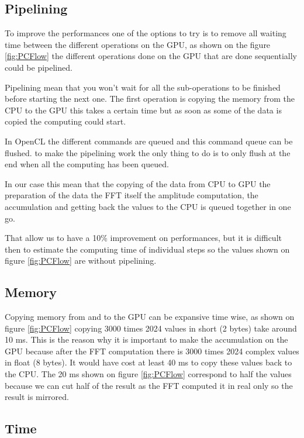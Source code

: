    \subsection{Pipelining}

   To improve the performances one of the options to try is to remove all waiting time between the different operations on the \gls{GPU}, as shown on the figure \ref{fig:PCFlow} the different operations done on the \gls{GPU} that are done sequentially could be pipelined.

   Pipelining mean that you won't wait for all the sub-operations to be finished before starting the next one. The first operation is copying the memory from the \gls{CPU} to the \gls{GPU} this takes a certain time but as soon as some of the data is copied the computing could start.

   In \gls{OpenCL} the different commands are queued and this command queue can be flushed. to make the pipelining work the only thing to do is to only flush at the end when all the computing has been queued.

   In our case this mean that the copying of the data from \gls{CPU} to \gls{GPU} the preparation of the data the \gls{FFT} itself the amplitude computation, the accumulation and getting back the values to the \gls{CPU} is queued together in one go.

   That allow us to have a 10\% improvement on performances, but it is difficult then to estimate the computing time of individual steps so the values shown on figure \ref{fig:PCFlow} are without pipelining.

   \subsection{Memory}

   Copying memory from and to the \gls{GPU} can be expansive time wise, as shown on figure \ref{fig:PCFlow} copying 3000 times 2024 values in short (2 bytes) take around 10 ms. This is the reason why it is important to make the accumulation on the \gls{GPU} because after the \gls{FFT} computation there is 3000 times 2024 complex values in float (8 bytes). It would have cost at least 40 ms to copy these values back to the \gls{CPU}. The 20 ms shown on figure \ref{fig:PCFlow} correspond to half the values because we can cut half of the result as the \gls{FFT} computed it in real only so the result is mirrored.
	
   \subsection{Time}

